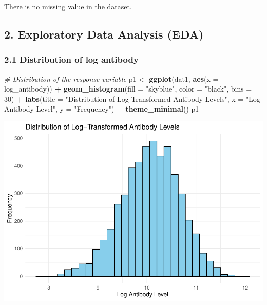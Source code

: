 \documentclass[
]{article}
\newenvironment{Shaded}{\begin{snugshade}}{\end{snugshade}}
\newcommand{\AttributeTok}[1]{\textcolor[rgb]{0.13,0.29,0.53}{#1}}
\newcommand{\CommentTok}[1]{\textcolor[rgb]{0.56,0.35,0.01}{\textit{#1}}}
\newcommand{\DecValTok}[1]{\textcolor[rgb]{0.00,0.00,0.81}{#1}}
\newcommand{\FunctionTok}[1]{\textcolor[rgb]{0.13,0.29,0.53}{\textbf{#1}}}
\newcommand{\NormalTok}[1]{#1}
\newcommand{\OtherTok}[1]{\textcolor[rgb]{0.56,0.35,0.01}{#1}}
\newcommand{\SpecialCharTok}[1]{\textcolor[rgb]{0.81,0.36,0.00}{\textbf{#1}}}
\newcommand{\StringTok}[1]{\textcolor[rgb]{0.31,0.60,0.02}{#1}}
\begin{document}
There is no missing value in the dataset.

\subsection{2. Exploratory Data Analysis
(EDA)}\label{exploratory-data-analysis-eda}

\subsubsection{2.1 Distribution of log
antibody}\label{distribution-of-log-antibody}

\begin{Shaded}
\begin{Highlighting}[]
\CommentTok{\# Distribution of the response variable}
\NormalTok{p1 }\OtherTok{\textless{}{-}} \FunctionTok{ggplot}\NormalTok{(dat1, }\FunctionTok{aes}\NormalTok{(}\AttributeTok{x =}\NormalTok{ log\_antibody)) }\SpecialCharTok{+} 
  \FunctionTok{geom\_histogram}\NormalTok{(}\AttributeTok{fill =} \StringTok{"skyblue"}\NormalTok{, }\AttributeTok{color =} \StringTok{"black"}\NormalTok{, }\AttributeTok{bins =} \DecValTok{30}\NormalTok{) }\SpecialCharTok{+}
  \FunctionTok{labs}\NormalTok{(}\AttributeTok{title =} \StringTok{"Distribution of Log{-}Transformed Antibody Levels"}\NormalTok{,}
       \AttributeTok{x =} \StringTok{"Log Antibody Level"}\NormalTok{, }\AttributeTok{y =} \StringTok{"Frequency"}\NormalTok{) }\SpecialCharTok{+}
  \FunctionTok{theme\_minimal}\NormalTok{()}
\NormalTok{p1}
\end{Highlighting}
\end{Shaded}

\includegraphics{p8106_midterm_project_files/figure-latex/unnamed-chunk-9-1.pdf}
\end{document}
